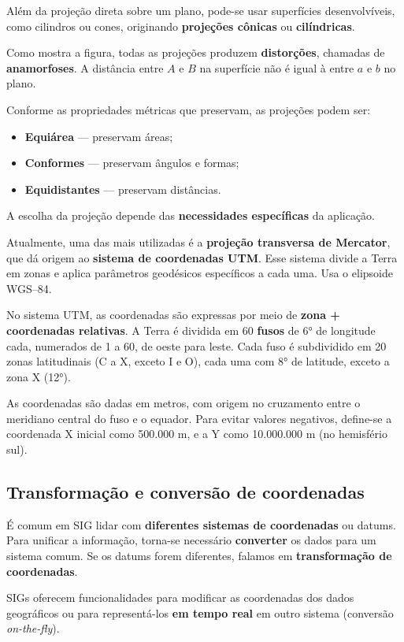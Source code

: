 Além da projeção direta sobre um plano, pode-se usar superfícies desenvolvíveis, como cilindros ou cones, originando \textbf{projeções cônicas} ou \textbf{cilíndricas}.

Como mostra a figura, todas as projeções produzem \textbf{distorções}, chamadas de \textbf{anamorfoses}. A distância entre $A$ e $B$ na superfície não é igual à entre $a$ e $b$ no plano.

Conforme as propriedades métricas que preservam, as projeções podem ser:

\begin{itemize}
 \item \textbf{Equiárea} — preservam áreas;
 \item \textbf{Conformes} — preservam ângulos e formas;
 \item \textbf{Equidistantes} — preservam distâncias.
\end{itemize}

A escolha da projeção depende das \textbf{necessidades específicas} da aplicação.

Atualmente, uma das mais utilizadas é a \textbf{projeção transversa de Mercator}, que dá origem ao \textbf{sistema de coordenadas UTM}. Esse sistema divide a Terra em zonas e aplica parâmetros geodésicos específicos a cada uma. Usa o elipsoide WGS--84.

No sistema UTM, as coordenadas são expressas por meio de \textbf{zona + coordenadas relativas}. A Terra é dividida em 60 \textbf{fusos} de 6° de longitude cada, numerados de 1 a 60, de oeste para leste. Cada fuso é subdividido em 20 zonas latitudinais (C a X, exceto I e O), cada uma com 8° de latitude, exceto a zona X (12°).

As coordenadas são dadas em metros, com origem no cruzamento entre o meridiano central do fuso e o equador. Para evitar valores negativos, define-se a coordenada X inicial como 500.000 m, e a Y como 10.000.000 m (no hemisfério sul).

\subsection{Transformação e conversão de coordenadas}

É comum em SIG lidar com \textbf{diferentes sistemas de coordenadas} ou datums. Para unificar a informação, torna-se necessário \textbf{converter} os dados para um sistema comum. Se os datums forem diferentes, falamos em \textbf{transformação de coordenadas}.

SIGs oferecem funcionalidades para modificar as coordenadas dos dados geográficos ou para representá-los \textbf{em tempo real} em outro sistema (conversão \emph{on-the-fly}).

